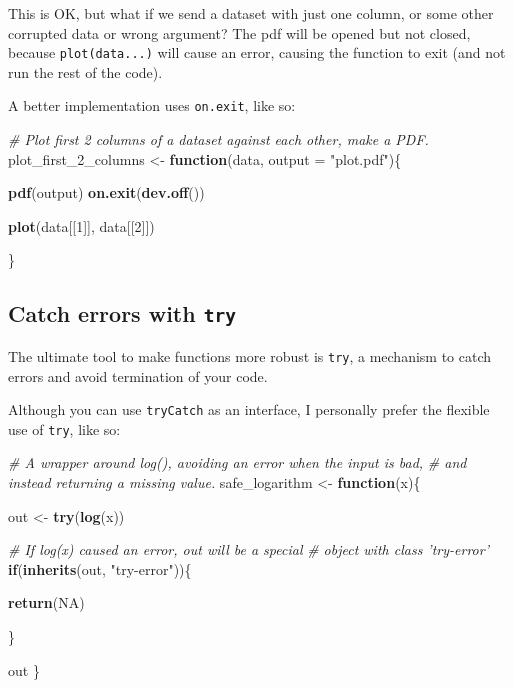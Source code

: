 \documentclass[]{book}
\newenvironment{Shaded}{\begin{snugshade}}{\end{snugshade}}
\newcommand{\CommentTok}[1]{\textcolor[rgb]{0.56,0.35,0.01}{\textit{#1}}}
\newcommand{\ControlFlowTok}[1]{\textcolor[rgb]{0.13,0.29,0.53}{\textbf{#1}}}
\newcommand{\DataTypeTok}[1]{\textcolor[rgb]{0.13,0.29,0.53}{#1}}
\newcommand{\DecValTok}[1]{\textcolor[rgb]{0.00,0.00,0.81}{#1}}
\newcommand{\KeywordTok}[1]{\textcolor[rgb]{0.13,0.29,0.53}{\textbf{#1}}}
\newcommand{\NormalTok}[1]{#1}
\newcommand{\OtherTok}[1]{\textcolor[rgb]{0.56,0.35,0.01}{#1}}
\newcommand{\StringTok}[1]{\textcolor[rgb]{0.31,0.60,0.02}{#1}}
\begin{document}
This is OK, but what if we send a dataset with just one column, or some other corrupted data or wrong argument? The pdf will be opened but not closed, because \texttt{plot(data...)} will cause an error, causing the function to exit (and not run the rest of the code).

A better implementation uses \texttt{on.exit}, like so:

\begin{Shaded}
\begin{Highlighting}[]
\CommentTok{# Plot first 2 columns of a dataset against each other, make a PDF.}
\NormalTok{plot_first_}\DecValTok{2}\NormalTok{_columns <-}\StringTok{ }\ControlFlowTok{function}\NormalTok{(data, }\DataTypeTok{output =} \StringTok{"plot.pdf"}\NormalTok{)\{}
  
  \KeywordTok{pdf}\NormalTok{(output)}
  \KeywordTok{on.exit}\NormalTok{(}\KeywordTok{dev.off}\NormalTok{())}
  
  \KeywordTok{plot}\NormalTok{(data[[}\DecValTok{1}\NormalTok{]], data[[}\DecValTok{2}\NormalTok{]])}
  
\NormalTok{\}}
\end{Highlighting}
\end{Shaded}

\hypertarget{catch-errors-with-try}{%
\subsection{\texorpdfstring{Catch errors with \texttt{try}}{Catch errors with try}}\label{catch-errors-with-try}}

The ultimate tool to make functions more robust is \texttt{try}, a mechanism to catch errors and avoid termination of your code.

Although you can use \texttt{tryCatch} as an interface, I personally prefer the flexible use of \texttt{try}, like so:

\begin{Shaded}
\begin{Highlighting}[]
\CommentTok{# A wrapper around log(), avoiding an error when the input is bad,}
\CommentTok{# and instead returning a missing value.}
\NormalTok{safe_logarithm <-}\StringTok{ }\ControlFlowTok{function}\NormalTok{(x)\{}
  
\NormalTok{  out <-}\StringTok{ }\KeywordTok{try}\NormalTok{(}\KeywordTok{log}\NormalTok{(x))}
  
  \CommentTok{# If log(x) caused an error, out will be a special }
  \CommentTok{# object with class 'try-error'}
  \ControlFlowTok{if}\NormalTok{(}\KeywordTok{inherits}\NormalTok{(out, }\StringTok{"try-error"}\NormalTok{))\{}
    
    \KeywordTok{return}\NormalTok{(}\OtherTok{NA}\NormalTok{)}
    
\NormalTok{  \}}
  
\NormalTok{out}
\NormalTok{\}}
\end{Highlighting}
\end{Shaded}
\end{document}
